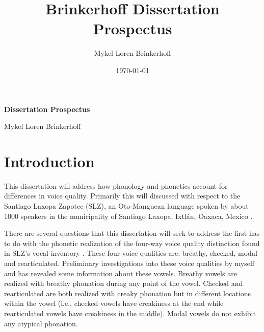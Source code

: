 \documentclass[12pt, letterpaper]{article}
\title{Brinkerhoff Dissertation Prospectus}
\author{Mykel Loren Brinkerhoff}
\date{\today}
\begin{document}

\onehalfspacing

\begin{center}
    {\Large \textbf{Dissertation Prospectus}}
    \vspace{6pt}

    Mykel Loren Brinkerhoff
\end{center}
\thispagestyle{fancy}


\section{Introduction} \label{sec:Introduction}

This dissertation will address how phonology and phonetics account for differences in voice quality. Primarily this will discussed with respect to the Santiago Laxopa Zapotec (SLZ), an Oto-Manguean language spoken by about 1000 speakers in the municipality of Santiago Laxopa, Ixtlán, Oaxaca, Mexico \citep{adlerAcousticsPhonationTypes2016,adlerDerivationVerbInitiality2018,brinkerhoffDownstepSantiagoLaxopaMFM,foleyForbiddenCliticClusters2018,SantiagoLaxopaEconomy,sichelFeaturalLifeNominals2020,silva-roblesElicitingAssociatedMotion2022}. 

There are several questions that this dissertation will seek to address the first has to do with the phonetic realization of the four-way voice quality distinction found in SLZ's vocal inventory \citep{adlerAcousticsPhonationTypes2016}. These four voice qualities are: breathy, checked, modal and rearticulated. Preliminary investigations into these voice qualities by myself and \citet{adlerAcousticsPhonationTypes2016} has revealed some information about these vowels. Breathy vowels are realized with breathy phonation during any point of the vowel. Checked and rearticulated are both realized with creaky phonation but in different locations within the vowel (i.e., checked vowels have creakiness at the end while rearticulated vowels have creakiness in the middle). Modal vowels do not exhibit any atypical phonation. 
\end{document}

